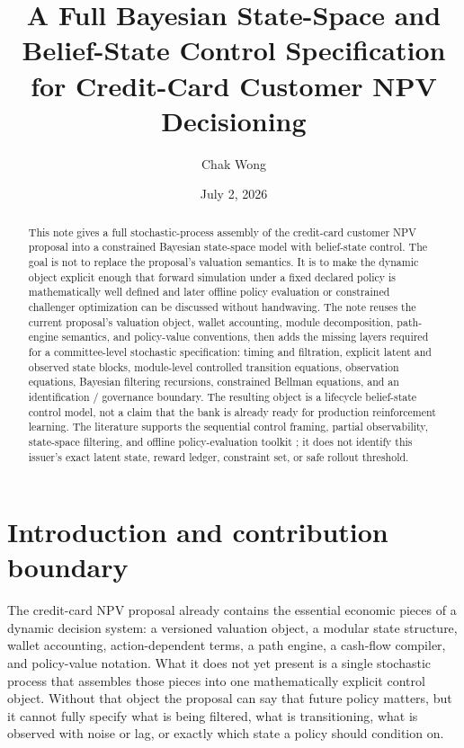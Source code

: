 \documentclass[11pt]{article}
\title{A Full Bayesian State-Space and Belief-State Control Specification\\
for Credit-Card Customer NPV Decisioning}
\author{Chak Wong}
\date{July 2, 2026}
\newcommand{\1}{\mathbf{1}}
\theoremstyle{definition}
\begin{document}
\maketitle

\begin{abstract}
This note gives a full stochastic-process assembly of the credit-card customer
NPV proposal into a constrained Bayesian state-space model with belief-state
control. The goal is not to replace the proposal's valuation semantics. It is
to make the dynamic object explicit enough that forward simulation under a
fixed declared policy is mathematically well defined and later offline policy
evaluation or constrained challenger optimization can be discussed without
handwaving. The note reuses the current proposal's valuation object, wallet
accounting, module decomposition, path-engine semantics, and policy-value
conventions, then adds the missing layers required for a committee-level
stochastic specification: timing and filtration, explicit latent and observed
state blocks, module-level controlled transition equations, observation
equations, Bayesian filtering recursions, constrained Bellman equations, and an
identification / governance boundary. The resulting object is a lifecycle
belief-state control model, not a claim that the bank is already ready for
production reinforcement learning. The literature supports the sequential
control framing, partial observability, state-space filtering, and offline
policy-evaluation toolkit
\citep{puterman1994mdp,murphy2003dynamic,smallwood1973pomdp,kaelbling1998pomdp,
trench2003bankone,durbinkoopman2012ssm,westharrison1997bfdm,doucet2001smc,
jiangli2016dr,huwager2021pomdpope,laroche2019spibb,khraishiokhrati2022offlinecredit};
it does not identify this issuer's exact latent state, reward ledger,
constraint set, or safe rollout threshold.
\end{abstract}

\section{Introduction and contribution boundary}

The credit-card NPV proposal already contains the essential economic pieces of a
dynamic decision system: a versioned valuation object, a modular state
structure, wallet accounting, action-dependent terms, a path engine, a
cash-flow compiler, and policy-value notation. What it does not yet present is a
single stochastic process that assembles those pieces into one mathematically
explicit control object. Without that object the proposal can say that future
policy matters, but it cannot fully specify what is being filtered, what is
transitioning, what is observed with noise or lag, or exactly which state a
policy should condition on.
\end{document}

